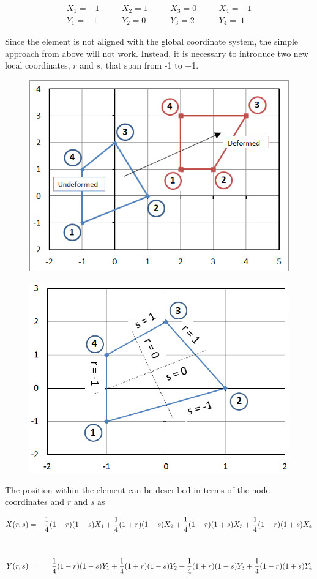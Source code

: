 \begin{align*}
X_1 = -1  & \quad & X_2 = 1 & \quad & X_3 = 0 & \quad & X_4 = -1 \\
Y_1 = -1  & \quad & Y_2 = 0 & \quad & Y_3 = 2 & \quad & Y_4 = ~1
\end{align*}

Since the element is not aligned with the global coordinate system, the simple approach from above will not work.  Instead, it is necessary to introduce two new local coordinates, $ r $ and $ s $, that span from -1 to +1.

\begin{figure}[h]
\centering
\includegraphics[width=0.7\linewidth]{figure/complex_element}
\caption{}
\label{fig:complex_element}
\end{figure}

\begin{figure}[h]
\centering
\includegraphics[width=0.7\linewidth]{figure/rs_shape_functions}
\caption{}
\label{fig:rs_shape_functions}
\end{figure}

The position within the element can be described in terms of the node coordinates and $ r $ and $ s $ as

\begin{eqnarray*}
X(r,s) & = & {1\over 4}(1-r)(1-s)X_1 + {1\over 4}(1+r)(1-s)X_2 + {1\over 4}(1+r)(1+s)X_3 + {1\over 4}(1-r)(1+s)X_4 \\
\\
\\
Y(r,s) & = & {1\over 4}(1-r)(1-s)Y_1 + {1\over 4}(1+r)(1-s)Y_2 + {1\over 4}(1+r)(1+s)Y_3 + {1\over 4}(1-r)(1+s)Y_4 \\
\end{eqnarray*}

